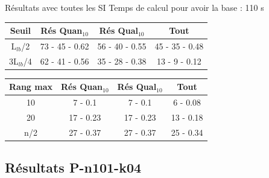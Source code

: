 \documentclass{beamer}
\begin{document}
\begin{frame}{Résultats avec toutes les SI}
Temps de calcul pour avoir la base : 110 s

\centering
\begin{tabular}{|c|c|c|c|}
   \hline
   Seuil & Rés Quan$_{10}$ & Rés Qual$_{10}$ & Tout \\
   \hline
   L$_{lb}$/2 & 73 - 45 - 0.62 & 56 - 40 - 0.55 & 45 - 35 - 0.48 \\
   \hline
   3L$_{lb}$/4 & 62 - 41 - 0.56 & 35 - 28 - 0.38  & 13 - 9 - 0.12 \\
   \hline
\end{tabular}

\begin{tabular}{|c|c|c|c|}
   \hline
   Rang max & Rés Quan$_{10}$ & Rés Qual$_{10}$ & Tout \\
   \hline
   10 & 7 - 0.1 & 7 - 0.1 & 6 - 0.08 \\
   \hline
   20 & 17 - 0.23 & 17 - 0.23 & 13 - 0.18 \\
   \hline
   n/2 & 27 - 0.37 & 27 - 0.37 & 25 - 0.34 \\
   \hline
\end{tabular}

\end{frame}


\subsection{Résultats P-n101-k04}
\end{document}
